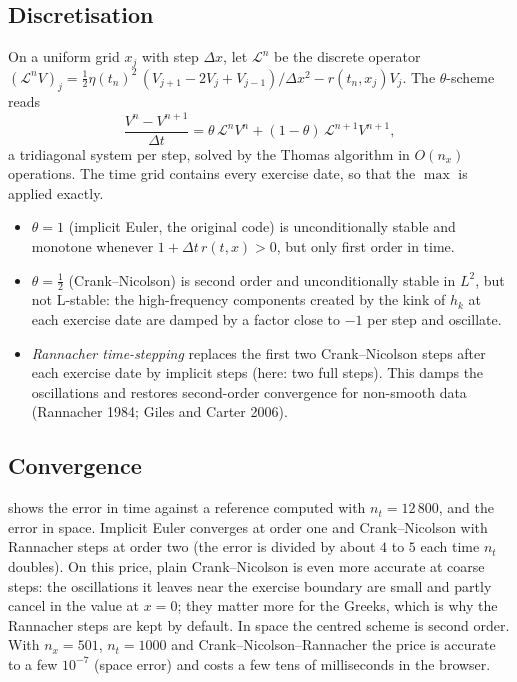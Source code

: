 \documentclass[11pt,a4paper]{article}
\theoremstyle{definition}
\theoremstyle{remark}
\begin{document}
\subsection{Discretisation}
On a uniform grid $x_j$ with step $\Delta x$, let $\mathcal L^n$ be the discrete operator
$(\mathcal L^nV)_j=\tfrac12\eta(t_n)^2\,(V_{j+1}-2V_j+V_{j-1})/\Delta x^2-r(t_n,x_j)V_j$. The $\theta$-scheme reads
\begin{equation}
  \frac{V^n-V^{n+1}}{\Delta t}=\theta\,\mathcal L^nV^n+(1-\theta)\,\mathcal L^{n+1}V^{n+1},
\end{equation}
a tridiagonal system per step, solved by the Thomas algorithm in $O(n_x)$ operations. The time grid contains every exercise
date, so that the $\max$ is applied exactly.
\begin{itemize}[nosep]
  \item $\theta=1$ (implicit Euler, the original code) is unconditionally stable and monotone whenever
        $1+\Delta t\,r(t,x)>0$, but only first order in time.
  \item $\theta=\tfrac12$ (Crank--Nicolson) is second order and unconditionally stable in $L^2$, but not L-stable: the
        high-frequency components created by the kink of $h_k$ at each exercise date are damped by a factor close to $-1$ per
        step and oscillate.
  \item \emph{Rannacher time-stepping} replaces the first two Crank--Nicolson steps after each exercise date by implicit
        steps (here: two full steps). This damps the oscillations and restores second-order convergence for non-smooth data
        (Rannacher 1984; Giles and Carter 2006).
\end{itemize}

\subsection{Convergence}
 shows the error in time against a reference computed with $n_t=12\,800$, and the error in space. Implicit
Euler converges at order one and Crank--Nicolson with Rannacher steps at order two (the error is divided by about $4$ to $5$
each time $n_t$ doubles). On this price, plain Crank--Nicolson is even more accurate at coarse steps: the oscillations it
leaves near the exercise boundary are small and partly cancel in the value at $x=0$; they matter more for the Greeks, which is
why the Rannacher steps are kept by default. In space the centred scheme is second order. With $n_x=501$, $n_t=1000$ and
Crank--Nicolson--Rannacher the price is accurate to a few $10^{-7}$ (space error) and costs a few tens of milliseconds in the
browser.
\end{document}
